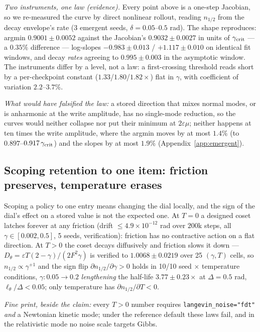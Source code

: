 \documentclass{article}
\begin{document}
\emph{Two instruments, one law (evidence).} Every point above is a one-step Jacobian, so we re-measured the curve by direct nonlinear rollout, reading $n_{1/2}$ from the decay envelope's rate (3 emergent seeds, $\delta=0.05$--$0.5$ rad). The shape reproduces: argmin $0.9001\pm0.0052$ against the Jacobian's $0.9032\pm0.0027$ in units of $\gamma_{\rm crit}$ --- a $0.35\%$ difference --- log-slopes $-0.983\pm0.013$ / $+1.117\pm0.010$ on identical fit windows, and decay \emph{rates} agreeing to $0.995\pm0.003$ in the asymptotic window. The instruments differ by a level, not a law: a first-crossing threshold reads short by a per-checkpoint constant ($1.33$/$1.80$/$1.82\times$) flat in $\gamma$, with coefficient of variation $2.2$--$3.7\%$. {\emph{What would have falsified the law:} a stored direction that mixes normal modes, or is anharmonic at the write amplitude, has no single-mode reduction, so the curves would neither collapse nor put their minimum at $2\varepsilon\mu$; neither happens at ten times the write amplitude, where the argmin moves by at most $1.4\%$ (to $0.897$--$0.917\,\gamma_{\rm crit}$) and the slopes by at most $1.9\%$ (Appendix~\ref{app:emergent}).\par}

\subsection{Scoping retention to one item: friction preserves, temperature erases}\label{sec:vault}

Scoping a policy to one entry means changing the dial locally, and the sign of the dial's effect on a stored value is not the expected one. At $T=0$ a designed coset latches forever at any friction (drift $\le4.9\times10^{-12}$ rad over $200$k steps, all $\gamma\in[0.002,0.5]$, 5 seeds, verification): friction has no contractive action on a flat direction. At $T>0$ the coset decays diffusively and friction slows it down --- $D_\theta=\varepsilon T(2-\gamma)/(2F^2\gamma)$ is verified to $1.0068\pm0.0219$ over 25 $(\gamma,T)$ cells, so $n_{1/2}\propto\gamma^{+1}$ and the sign flip $\partial n_{1/2}/\partial\gamma>0$ holds in 10/10 seed $\times$ temperature conditions, $\gamma:0.05\to0.2$ \emph{lengthening} the half-life $3.77\pm0.23\times$ at $\Delta=0.5$ rad, $\ell_\theta/\Delta<0.05$; only temperature has $\partial n_{1/2}/\partial T<0$. {\emph{Fine print, beside the claim:} every $T>0$ number requires \texttt{langevin\_noise="fdt"} \emph{and} a Newtonian kinetic mode; under the reference default these laws fail, and in the relativistic mode no noise scale targets Gibbs.\par}
\end{document}
